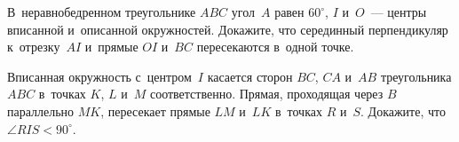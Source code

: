 \begin{problems}
\item
В~неравнобедренном треугольнике $ABC$ угол~$A$ равен $60^{\circ}$,
$I$ и~$O$~--- центры вписанной и~описанной окружностей.
Докажите, что серединный перпендикуляр к~отрезку~$AI$ и~прямые $OI$ и~$BC$
пересекаются в~одной точке.

\item
Вписанная окружность с~центром~$I$ касается сторон $BC$, $CA$ и~$AB$
треугольника $ABC$ в~точках $K$, $L$ и~$M$ соответственно.
Прямая, проходящая через $B$ параллельно $MK$, пересекает прямые $LM$ и~$LK$
в~точках $R$ и~$S$.
Докажите, что $\angle RIS < 90^\circ$.

\end{problems}

